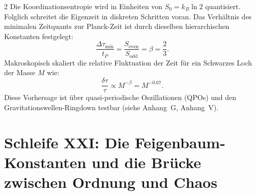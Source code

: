 \documentclass[12pt,a4paper]{article}
\begin{document}
\begin{multicols}{2}
		Die Koordinationsentropie wird in Einheiten von \(S_0 = k_B \ln 2\) quantisiert. Folglich schreitet die Eigenzeit in diskreten Schritten voran. Das Verhältnis des minimalen Zeitquants zur Planck-Zeit ist durch dieselben hierarchischen Konstanten festgelegt:
		\begin{equation}
			\boxed{\frac{\Delta \tau_{\min}}{t_P} = \frac{S_{\mathrm{even}}}{S_{\mathrm{odd}}} = \beta = \frac{2}{3}}.
		\end{equation}
		Makroskopisch skaliert die relative Fluktuation der Zeit für ein Schwarzes Loch der Masse \(M\) wie:
		\begin{equation}
			\frac{\delta \tau}{\tau} \propto M^{-\beta} = M^{-0.67}.
		\end{equation}
		Diese Vorhersage ist über quasi-periodische Oszillationen (QPOs) und den Gravitationswellen-Ringdown testbar (siehe Anhang~G, Anhang~V).
		
		\section{Schleife XXI: Die Feigenbaum-Konstanten und die Brücke zwischen Ordnung und Chaos}
		

\end{multicols}
\end{document}
